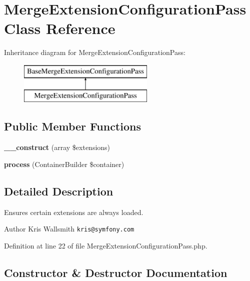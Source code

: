 \section{Merge\+Extension\+Configuration\+Pass Class Reference}
\label{class_symfony_1_1_component_1_1_http_kernel_1_1_dependency_injection_1_1_merge_extension_configuration_pass}
Inheritance diagram for Merge\+Extension\+Configuration\+Pass\+:\begin{figure}[H]
\begin{center}
\leavevmode
\includegraphics[height=2.000000cm]{class_symfony_1_1_component_1_1_http_kernel_1_1_dependency_injection_1_1_merge_extension_configuration_pass}
\end{center}
\end{figure}
\subsection*{Public Member Functions}
\begin{DoxyCompactItemize}
\item 
{\bf \+\_\+\+\_\+construct} (array \$extensions)
\item 
{\bf process} (Container\+Builder \$container)
\end{DoxyCompactItemize}


\subsection{Detailed Description}
Ensures certain extensions are always loaded.

\begin{DoxyAuthor}{Author}
Kris Wallsmith {\tt kris@symfony.\+com} 
\end{DoxyAuthor}


Definition at line 22 of file Merge\+Extension\+Configuration\+Pass.\+php.



\subsection{Constructor \& Destructor Documentation}
